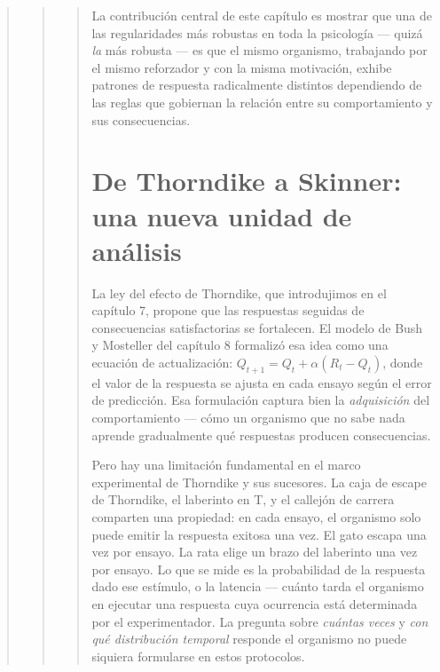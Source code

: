 \documentclass[
  letterpaper,
  DIV=11,
  numbers=noendperiod]{scrreprt}
\begin{document}
\begin{tcolorbox}[enhanced jigsaw, arc=.35mm, bottomrule=.15mm, breakable, colback=white, colframe=quarto-callout-note-color-frame, left=2mm, leftrule=.75mm, opacityback=0, rightrule=.15mm, toprule=.15mm]
\begin{quote}
\begin{quote}
\begin{quote}
La contribución central de este capítulo es mostrar que una de las
regularidades más robustas en toda la psicología --- quizá \emph{la} más
robusta --- es que el mismo organismo, trabajando por el mismo
reforzador y con la misma motivación, exhibe patrones de respuesta
radicalmente distintos dependiendo de las reglas que gobiernan la
relación entre su comportamiento y sus consecuencias.

\mbox{}%
\section{De Thorndike a Skinner: una nueva unidad de
análisis}\label{de-thorndike-a-skinner-una-nueva-unidad-de-anuxe1lisis}

La ley del efecto de Thorndike, que introdujimos en el capítulo 7,
propone que las respuestas seguidas de consecuencias satisfactorias se
fortalecen. El modelo de Bush y Mosteller del capítulo 8 formalizó esa
idea como una ecuación de actualización:
\(Q_{t+1} = Q_t + \alpha(R_t - Q_t)\), donde el valor de la respuesta se
ajusta en cada ensayo según el error de predicción. Esa formulación
captura bien la \emph{adquisición} del comportamiento --- cómo un
organismo que no sabe nada aprende gradualmente qué respuestas producen
consecuencias.

Pero hay una limitación fundamental en el marco experimental de
Thorndike y sus sucesores. La caja de escape de Thorndike, el laberinto
en T, y el callejón de carrera comparten una propiedad: en cada ensayo,
el organismo solo puede emitir la respuesta exitosa una vez. El gato
escapa una vez por ensayo. La rata elige un brazo del laberinto una vez
por ensayo. Lo que se mide es la probabilidad de la respuesta dado ese
estímulo, o la latencia --- cuánto tarda el organismo en ejecutar una
respuesta cuya ocurrencia está determinada por el experimentador. La
pregunta sobre \emph{cuántas veces} y \emph{con qué distribución
temporal} responde el organismo no puede siquiera formularse en estos
protocolos.


\end{quote}
\end{quote}
\end{quote}
\end{tcolorbox}
\end{document}
